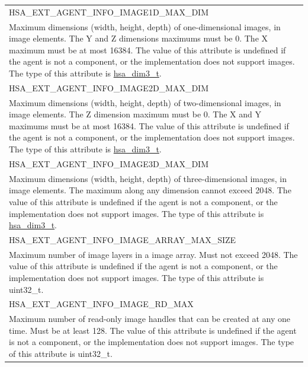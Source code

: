 \documentclass[final]{book}
\newcommand{\reftyp}[1]{#1}
\newcommand{\refenu}[1]{\reftyp{#1}}
\begin{document}
\begin{longtable}{@{\hspace{2em}}p{\linewidth-2em}}
\hspace{-2em}\refenu{HSA_\-EXT_\-AGENT_\-INFO_\-IMAGE1D_\-MAX_\-DIM}\\Maximum dimensions (width, height, depth) of one-dimensional images, in image elements. The Y and Z dimensions maximums must be 0. The X maximum must be at most 16384. The value of this attribute is undefined if the agent is not a component, or the implementation does not support images. The type of this attribute is \hyperlink{group__common_1ga6f7883588491965c45382cd996351aa2}{hsa_\-dim3_\-t}.\\[2mm]
\hspace{-2em}\refenu{HSA_\-EXT_\-AGENT_\-INFO_\-IMAGE2D_\-MAX_\-DIM}\\Maximum dimensions (width, height, depth) of two-dimensional images, in image elements. The Z dimension maximum must be 0. The X and Y maximums must be at most 16384. The value of this attribute is undefined if the agent is not a component, or the implementation does not support images. The type of this attribute is \hyperlink{group__common_1ga6f7883588491965c45382cd996351aa2}{hsa_\-dim3_\-t}.\\[2mm]
\hspace{-2em}\refenu{HSA_\-EXT_\-AGENT_\-INFO_\-IMAGE3D_\-MAX_\-DIM}\\Maximum dimensions (width, height, depth) of three-dimensional images, in image elements. The maximum along any dimension cannot exceed 2048. The value of this attribute is undefined if the agent is not a component, or the implementation does not support images. The type of this attribute is \hyperlink{group__common_1ga6f7883588491965c45382cd996351aa2}{hsa_\-dim3_\-t}.\\[2mm]
\hspace{-2em}\refenu{HSA_\-EXT_\-AGENT_\-INFO_\-IMAGE_\-ARRAY_\-MAX_\-SIZE}\\Maximum number of image layers in a image array. Must not exceed 2048. The value of this attribute is undefined if the agent is not a component, or the implementation does not support images. The type of this attribute is uint32_\-t.\\[2mm]
\hspace{-2em}\refenu{HSA_\-EXT_\-AGENT_\-INFO_\-IMAGE_\-RD_\-MAX}\\Maximum number of read-only image handles that can be created at any one time. Must be at least 128. The value of this attribute is undefined if the agent is not a component, or the implementation does not support images. The type of this attribute is uint32_\-t.\\[2mm]

\end{longtable}
\end{document}
